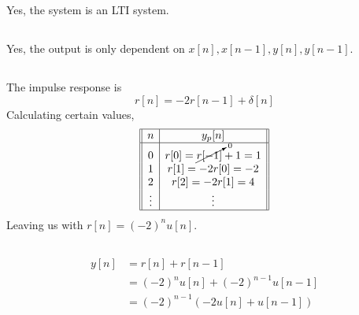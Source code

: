 \documentclass{article}
\begin{document}
Yes, the system is an LTI system.

\subsection{}

Yes, the output is only dependent on \(x[n], x[n - 1], y[n], y[n - 1]\).

\subsection{}

The impulse response is
\begin{equation}
    r[n] = -2r[n - 1] + \delta[n]
\end{equation}
Calculating certain values,
\begin{equation}
    \begin{array}[]{||c|c||}
        \hline
        n & y_p[n] \\
        \hline
        0 & r[0] = \cancelto{0}{r[-1]} + 1 = 1 \\
        1 & r[1] = -2r[0] = -2 \\
        2 & r[2] = -2r[1] = 4 \\
        \vdots & \vdots \\
        \hline
    \end{array}
\end{equation}
Leaving us with \(r[n] = (-2)^n u[n]\).

\subsection{}

\begin{align}
    y[n] &= r[n] + r[n - 1] \\
    &= (-2)^n u[n] + (-2)^{n - 1} u[n - 1] \\
    &= (-2)^{n - 1} (-2u[n] + u[n - 1])
\end{align}

\subsection{}
\end{document}
